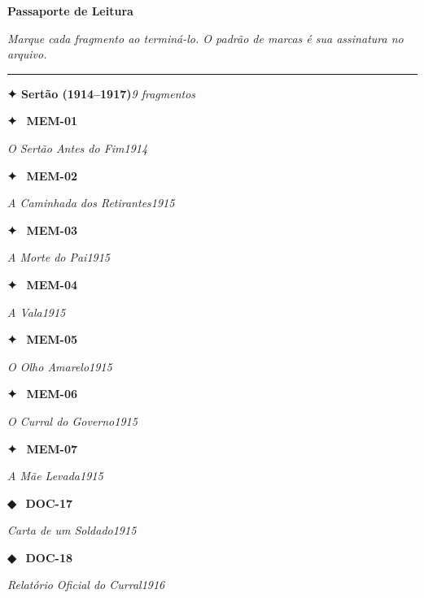 \cleardoublepage
\thispagestyle{empty}
\vspace*{2em}
{\centering\normalfont\Huge\bfseries Passaporte de Leitura\par}
\vspace{0.4em}
{\centering\small\textit{Marque cada fragmento ao terminá-lo. O padrão de marcas é sua assinatura no arquivo.}\par}
\vspace{0.8em}

\newcommand{\passaporte}[3]{%
  \noindent\textcolor{olho}{\large\textbf{✦}}\ %
  \textbf{#1}\ {\small\textit{#2}\hfill\textit{#3}\par}\vspace{0.12em}}

\newcommand{\passaportecont}[3]{%
  \noindent\textcolor{cont}{\large\textbf{●}}\ %
  \textbf{#1}\ {\small\textit{#2}\hfill\textit{#3}\par}\vspace{0.12em}}

\newcommand{\passaporteluc}[3]{%
  \noindent\textcolor{luc}{\large\textbf{✦}}\ %
  \textbf{#1}\ {\small\textit{#2}\hfill\textit{#3}\par}\vspace{0.12em}}

\newcommand{\passaportedoc}[3]{%
  \noindent\textcolor{doc}{\large\textbf{◆}}\ %
  \textbf{#1}\ {\small\textit{#2}\hfill\textit{#3}\par}\vspace{0.12em}}

\vspace{0.2em}
\noindent\textcolor{mem}{\rule{0.15\textwidth}{0.8pt}}\hspace{0.5em}%
{\small\textbf{\textcolor{mem}{✦ Sertão (1914--1917)}}}\hfill{\small\itshape\textcolor{mem}{9 fragmentos}}\par
\vspace{0.3em}

\passaporte{MEM-01}{O Sertão Antes do Fim}{1914}
\passaporte{MEM-02}{A Caminhada dos Retirantes}{1915}
\passaporte{MEM-03}{A Morte do Pai}{1915}
\passaporte{MEM-04}{A Vala}{1915}
\passaporte{MEM-05}{O Olho Amarelo}{1915}
\passaporte{MEM-06}{O Curral do Governo}{1915}
\passaporte{MEM-07}{A Mãe Levada}{1915}
\passaportedoc{DOC-17}{Carta de um Soldado}{1915}
\passaportedoc{DOC-18}{Relatório Oficial do Curral}{1916}

